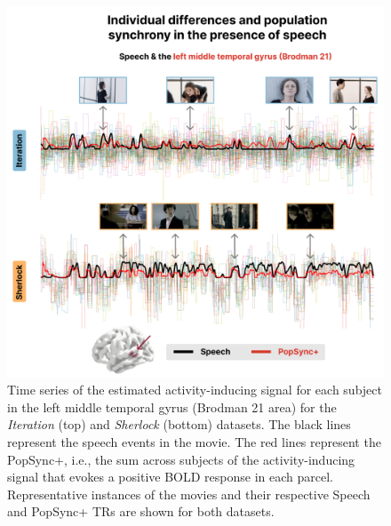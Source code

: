 \begin{figure}[!ht]
\centering
\includegraphics[width=0.9\linewidth]{figures/multi_subject/time_speech.png}
\caption[]{Time series of the estimated activity-inducing signal for each
subject in the left middle temporal gyrus (Brodman 21 area) for the
\textit{Iteration} (top) and \textit{Sherlock} (bottom) datasets. The black
lines represent the speech events in the movie. The red lines represent the
PopSync+, i.e., the sum across subjects of the activity-inducing signal that
evokes a positive BOLD response in each parcel. Representative instances of the
movies and their respective Speech and PopSync+ TRs are shown for both
datasets.}
\label{fig:time_series_speech}
\end{figure}

